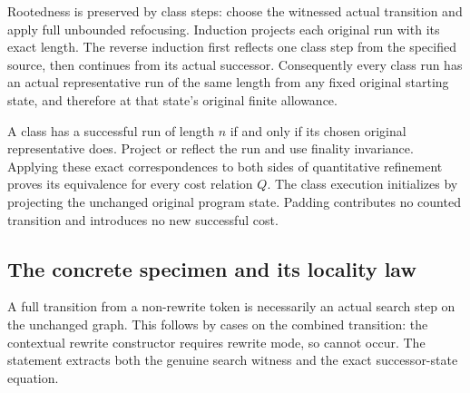 



Rootedness is preserved by class steps: choose the witnessed actual
transition and apply full unbounded refocusing. Induction projects each
original run with its exact length. The reverse induction first reflects
one class step from the specified source, then continues from its actual
successor. Consequently every class run has an actual representative run
of the same length from any fixed original starting state, and therefore
at that state's original finite allowance.




A class has a successful run of length $n$ if and only if its chosen
original representative does. Project or reflect the run and use finality
invariance. Applying these exact correspondences to both sides of quantitative
refinement proves its equivalence for every cost relation $Q$. The class
execution initializes by projecting the unchanged original program state.
Padding contributes no counted transition and introduces no new successful
cost.




\subsection{The concrete specimen and its locality law}

A full transition from a non-rewrite token is necessarily an actual
search step on the unchanged graph. This follows by cases on the combined
transition: the contextual rewrite constructor requires rewrite mode, so
cannot occur. The statement extracts both the genuine search witness and
the exact successor-state equation.

